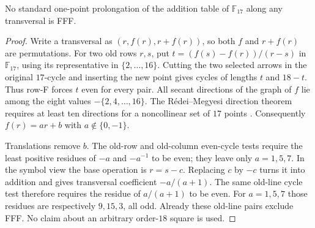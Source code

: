 \begin{proposition}
\label{prop:cyclic17-transversal}
No standard one-point prolongation of the addition table of
$\mathbb F_{17}$ along any transversal is FFF.
\end{proposition}

\begin{proof}
Write a transversal as $(r,f(r),r+f(r))$, so both $f$ and $r+f(r)$
are permutations. For two old rows $r,s$, put
$t=(f(s)-f(r))/(r-s)$ in $\mathbb F_{17}$, using its representative
in $\{2,\ldots,16\}$. Cutting the two selected arrows in the original
$17$-cycle and inserting the new point gives cycles of lengths
$t$ and $18-t$. Thus row-F forces $t$ even for every pair.
All secant directions of the graph of $f$ lie among the eight
values $-\{2,4,\ldots,16\}$. The R\'edei--Megyesi direction theorem
requires at least ten directions for a noncollinear set of
$17$ points \cite[Theorem~1.1]{Somlai2022Directions}.
Consequently $f(r)=ar+b$ with $a\notin\{0,-1\}$.

Translations remove $b$. The old-row and old-column even-cycle
tests require the least positive residues of $-a$ and $-a^{-1}$
to be even; they leave only $a=1,5,7$. In the symbol view the
base operation is $r=s-c$. Replacing $c$ by $-c$ turns it into
addition and gives transversal coefficient $-a/(a+1)$.
The same old-line cycle test therefore requires the residue of
$a/(a+1)$ to be even. For $a=1,5,7$ those residues are respectively
$9,15,3$, all odd. Already these old-line pairs exclude FFF.
No claim about an arbitrary order-$18$ square is used.
\end{proof}

